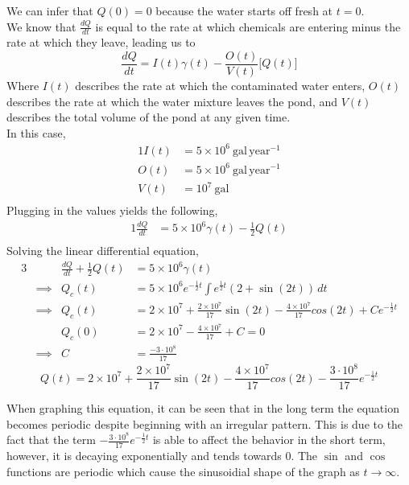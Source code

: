 \documentclass[twoside]{report}
\begin{document}
\begin{example}[Modelling]
        \noindent We can infer that $Q(0) = 0$ because the water starts off fresh at $t = 0$.\\
        We know that $\frac{dQ}{dt}$ is equal to the rate at which chemicals are entering minus the rate at which they leave, leading us to
        \[\frac{dQ}{dt} = I(t)\gamma(t) - \frac{O(t)}{V(t)}\big[Q(t)\big]\]
        Where $I(t)$ describes the rate at which the contaminated water enters, $O(t)$ describes the rate at which the water mixture leaves the pond, and $V(t)$ describes the total volume of the pond at any given time.\\
        In this case,
        \begin{alignat}{1}
            I(t) &= 5\times 10^{6}\ \text{gal}\,\text{year}^{-1}\\
            O(t) &= 5\times 10^{6}\ \text{gal}\,\text{year}^{-1}\\
            V(t) &= 10^{7}\ \text{gal}\\
        \end{alignat}
        Plugging in the values yields the following,
        \begin{alignat}{1}
            \frac{dQ}{dt} &= 5\times 10^{6}\gamma(t) - \frac{1}{2}Q(t)\\
        \end{alignat}
        Solving the linear differential equation,
        \begin{alignat}{3}
            &&\frac{dQ}{dt} + \frac{1}{2}Q(t) &=  5\times 10^{6}\gamma(t)\\
            &\implies&Q_{c}(t)&=5\times 10^{6}e^{-\frac{1}{2}t}\int e^{\frac{1}{2}t}(2 + \sin(2t))\,dt\\
            &\implies&Q_{c}(t)&=2\times 10^{7} + \frac{2\times 10^{7}}{17}\sin(2t)-\frac{4\times 10^{7}}{17}cos(2t) + Ce^{-\frac{1}{2}t}\\
            &&Q_{c}(0) &= 2\times 10^{7}-\frac{4\times 10^{7}}{17} + C = 0\\
            &\implies&C&=\frac{-3\cdot10^{8}}{17}
        \end{alignat}
        \begin{equation}    
            Q(t)=2\times 10^{7} + \frac{2\times 10^{7}}{17}\sin(2t)-\frac{4\times 10^{7}}{17}cos(2t) - \frac{3\cdot10^{8}}{17}e^{-\frac{1}{2}t}
        \end{equation}
    \end{example}
    \begin{remark}
        When graphing this equation, it can be seen that in the long term the equation becomes periodic despite beginning with an irregular pattern. This is due to the fact that the term $- \frac{3\cdot10^{8}}{17}e^{-\frac{1}{2}t}$ is able to affect the behavior in the short term, however, it is decaying exponentially and tends towards $0$. The $\sin$ and $\cos$ functions are periodic which cause the sinusoidial shape of the graph as $t \to \infty$.
    \end{remark}
\end{document}
